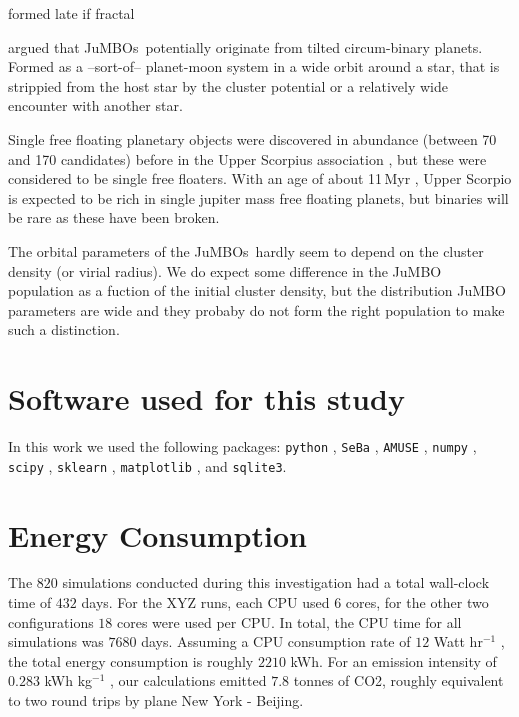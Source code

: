 \documentclass[submission,phys]{lib/SciPost}
\newcommand{\jumbo}{\mbox{JuMBO}}
\newcommand{\jumbos}{\mbox{JuMBOs}}
\begin{document}
formed late if fractal


\cite{2023arXiv231015603C} argued that \jumbos\, potentially originate
from tilted circum-binary planets. Formed as a --sort-of-- planet-moon
system in a wide orbit around a star, that is strippied from the host
star by the cluster potential or a relatively wide encounter with
another star. 


Single free floating planetary objects were discovered in abundance
(between 70 and 170 candidates) before in the Upper Scorpius
association \cite{2022NatAs...6...89M}, but these were considered to
be single free floaters.  With an age of about 11\,Myr \cite{++},
Upper Scorpio is expected to be rich in single jupiter mass free
floating planets, but binaries will be rare as these have been broken.

The orbital parameters of the \jumbos\, hardly seem to depend on the
cluster density (or virial radius). We do expect some difference in
the \jumbo\, population as a fuction of the initial cluster density,
but the distribution \jumbo\, parameters are wide and they probaby do
not form the right population to make such a distinction.

\section*{Software used for this study}

In this work we used the following packages: \texttt{python}
\cite{python2,python3}, \texttt{SeBa} \cite{PortegiesZwart1996,
  Toonen2012}, \texttt{AMUSE} \cite{2018araa.book.....P},
\texttt{numpy} \cite{numpy}, \texttt{scipy} \cite{scipy},
\texttt{sklearn} \cite{sklearn}, \texttt{matplotlib}
\cite{Hunter2007}, and \texttt{sqlite3}.

\section*{Energy Consumption}

The $820$ simulations conducted during this investigation had a total
wall-clock time of $432$ days. For the XYZ runs, each CPU used $6$
cores, for the other two configurations $18$ cores were used per
CPU. In total, the CPU time for all simulations was $7680$
days. Assuming a CPU consumption rate of $12$ Watt hr$^{-1}$
\cite{PortegiesZwart2020}, the total energy consumption is roughly
$2210$ kWh. For an emission intensity of $0.283$ kWh kg$^{-1}$
\cite{Wittman}, our calculations emitted $7.8$ tonnes of CO2, roughly
equivalent to two round trips by plane New York - Beijing.
\end{document}
